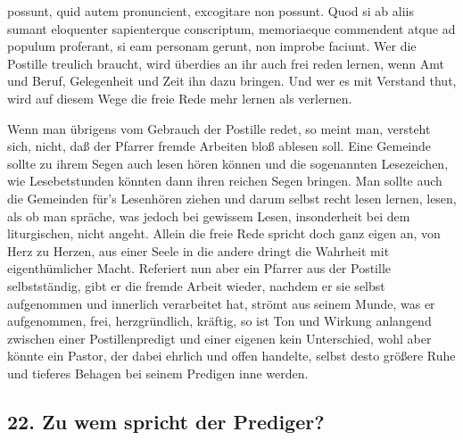 possunt, quid autem pronuncient, excogitare non possunt. Quod si ab aliis sumant eloquenter sapienterque conscriptum, memoriaeque commendent atque ad populum proferant, si eam personam gerunt, non improbe faciunt. Wer die Postille treulich braucht, wird überdies an ihr auch frei reden lernen, wenn Amt und Beruf, Gelegenheit und Zeit ihn dazu bringen. Und wer es mit Verstand thut, wird auf diesem Wege die freie Rede mehr lernen als verlernen.

Wenn man übrigens vom Gebrauch der Postille redet, so meint man, versteht sich, nicht, daß der Pfarrer fremde Arbeiten bloß ablesen soll. Eine Gemeinde sollte zu ihrem Segen auch lesen hören können und die sogenannten Lesezeichen, wie Lesebetstunden könnten dann ihren reichen Segen bringen. Man sollte auch die Gemeinden für’s Lesenhören ziehen und darum selbst recht lesen lernen, lesen, als ob man spräche, was jedoch bei gewissem Lesen, insonderheit bei dem liturgischen, nicht angeht. Allein die freie Rede spricht doch ganz eigen an, von Herz zu Herzen, aus einer Seele in die andere dringt die Wahrheit mit eigenthümlicher Macht. Referiert nun aber ein Pfarrer aus der Postille selbstständig, gibt er die fremde Arbeit wieder, nachdem er sie selbst aufgenommen und innerlich verarbeitet hat, strömt aus seinem Munde, was er aufgenommen, frei, herzgründlich, kräftig, so ist Ton und Wirkung anlangend zwischen einer Postillenpredigt und einer eigenen kein Unterschied, wohl aber könnte ein Pastor, der dabei ehrlich und offen handelte, selbst desto größere Ruhe und tieferes Behagen bei seinem Predigen inne werden.

\subsection*{22. Zu wem spricht der Prediger?}

